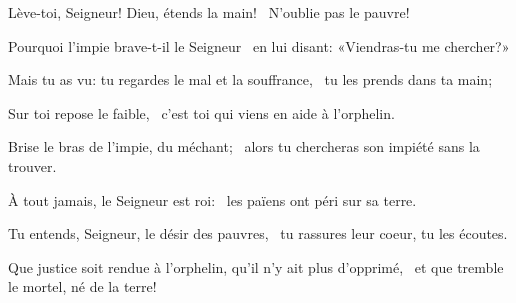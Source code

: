 \item Lève-toi, Seigneur! Dieu, étends la main!~\psstar{} N'oublie pas le pauvre!
\item Pourquoi l'impie brave-t-il le Seigneur~\psstar{} en lui disant: «Viendras-tu me chercher?»
\item Mais tu as vu: tu regardes le mal et la souffrance,~\psstar{} tu les prends dans ta main;
\item Sur toi repose le faible,~\psstar{} c'est toi qui viens en aide à l'orphelin.
\item Brise le bras de l'impie, du méchant;~\psstar{} alors tu chercheras son impiété sans la trouver.
\item À tout jamais, le Seigneur est roi:~\psstar{} les païens ont péri sur sa terre.
\item Tu entends, Seigneur, le désir des pauvres,~\psstar{} tu rassures leur coeur, tu les écoutes.
\item Que justice soit rendue à l'orphelin, qu'il n'y ait plus d'opprimé,~\psstar{} et que tremble le mortel, né de la terre!